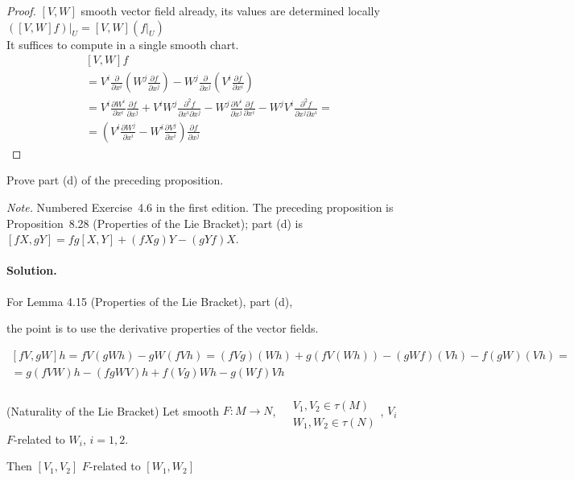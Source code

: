 \begin{proof}
  $[V,W]$ smooth vector field already, its values are determined locally $\left. ([V,W] f ) \right|_U = [V,W] ( \left. f \right|_U )$  \\
It suffices to compute in a single smooth chart.  
\[
\begin{gathered}
[V,W] f \\
  = V^i \frac{ \partial }{ \partial x^i } \left( W^j \frac{ \partial f}{ \partial x^j} \right) - W^j \frac{ \partial }{ \partial x^j} \left( V^i \frac{ \partial f}{ \partial x^i }\right) \\
  = V^i \frac{ \partial W^i}{ \partial x^i } \frac{ \partial f}{ \partial x^j} + V^i W^j \frac{ \partial^2 f}{ \partial x^i \partial x^j } - W^j \frac{ \partial V^i }{ \partial x^j} \frac{ \partial f}{ \partial x^i } - W^j V^i \frac{ \partial^2 f}{ \partial x^j  \partial x^i } = \\
= \left( V^i \frac{ \partial W^j}{ \partial x^i } - W^i \frac{ \partial V^j}{ \partial x^i} \right) \frac{ \partial f}{ \partial x^j}
\end{gathered}
\]

\end{proof}

\begin{exercise}
Prove part (d) of the preceding proposition.
\end{exercise}
\noindent\emph{Note.} Numbered Exercise~4.6 in the first edition. The preceding proposition is Proposition~8.28 (Properties of the Lie Bracket); part (d) is $[fX,gY]=fg[X,Y]+(fXg)Y-(gYf)X$.
\paragraph{Solution.}

For Lemma 4.15 (Properties of the Lie Bracket), part (d), 

the point is to use the derivative properties of the vector fields.  

\[
\begin{gathered}
  \left[fV, gW \right] h = fV( gW h ) - gW (fVh) = (fVg)(Wh) + g(fV(Wh)) - (gWf)(Vh) - f(gW)(Vh) = \\
  = g( f VW) h - (fgWV)h +   f(Vg)W h - g(Wf)Vh
\end{gathered}
\]

\begin{proposition}[4.16] (Naturality of the Lie Bracket)
  Let smooth $F:M \to N$, \quad $\begin{aligned} & \quad \\ & V_1, V_2 \in \tau(M) \\ & W_1, W_2 \in \tau(N) \end{aligned}$, \quad $V_i$ \, $F$-related to $W_i$, $i=1,2$.  

Then $[V_1, V_2 ]$ $F$-related to $[W_1, W_2]$

\end{proposition}

